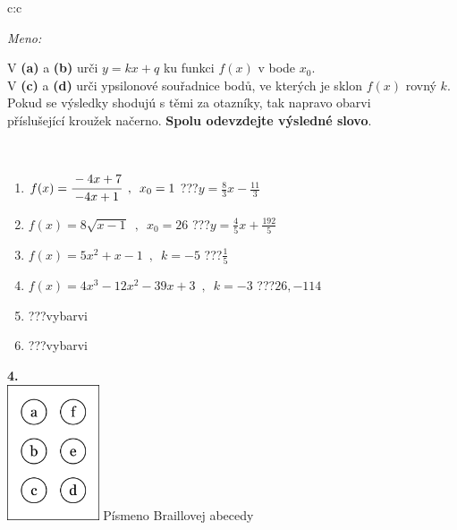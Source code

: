 \documentclass[10pt]{report}
\begin{document}
\begin{tabular}{c:c}
\begin{minipage}[c][104.5mm][t]{0.5\linewidth}
\begin{center}
\textit{Meno:}\phantom{xxxxxxxxxxxxxxxxxxxxxxxxxxxxxxxxxxxxxxxxxxxxxxxxxxxxxxxxxxxxxxxxx}\\[5mm]
\begin{minipage}{0.95\linewidth}
\begin{center}
V \textbf{(a)} a \textbf{(b)} urči  $y = kx + q$ ku funkci $f(x)$ v bode $x_0$.\\V \textbf{(c)} a \textbf{(d)} urči ypsilonové souřadnice bodů, ve kterých je sklon $f(x)$ rovný $k$.\\Pokud se výsledky shodujú s těmi za otazníky, tak napravo obarvi\\příslušející kroužek načerno. \textbf{Spolu odevzdejte výsledné slovo}.
\end{center}
\end{minipage}
\\[1mm]
\begin{minipage}{0.79\linewidth}
\begin{center}
\begin{varwidth}{\linewidth}
\begin{enumerate}
\small
\item $f(x)=\cfrac{-4x+7}{-4x+1}\enspace , \enspace x_0=1$\quad \dotfill\; ???\;\dotfill \quad $y = \frac{8}{3}x-\frac{11}{3}$
\item $f(x)=8\sqrt{x-1}\enspace , \enspace x_0=26$\quad \dotfill\; ???\;\dotfill \quad $y = \frac{4}{5}x+\frac{192}{5}$
\item $f(x)=5x^2+x-1\enspace , \enspace k=-5$\quad \dotfill\; ???\;\dotfill \quad $\frac{1}{5}$
\item $f(x)=4x^3-12x^2-39x+3\enspace , \enspace k=-3$\quad \dotfill\; ???\;\dotfill \quad $26 , -114$
\item \quad \dotfill\; ???\;\dotfill \quad vybarvi
\item \quad \dotfill\; ???\;\dotfill \quad vybarvi
\end{enumerate}
\end{varwidth}
\end{center}
\end{minipage}
\begin{minipage}{0.20\linewidth}
\begin{center}
{\Huge\bfseries 4.} \\[2mm]
\includegraphics[height=40mm]{../images/braille.png}
{\small Písmeno Braillovej abecedy}
\end{center}
\end{minipage}
\end{center}
\end{minipage}
%
\end{tabular}
\end{document}
